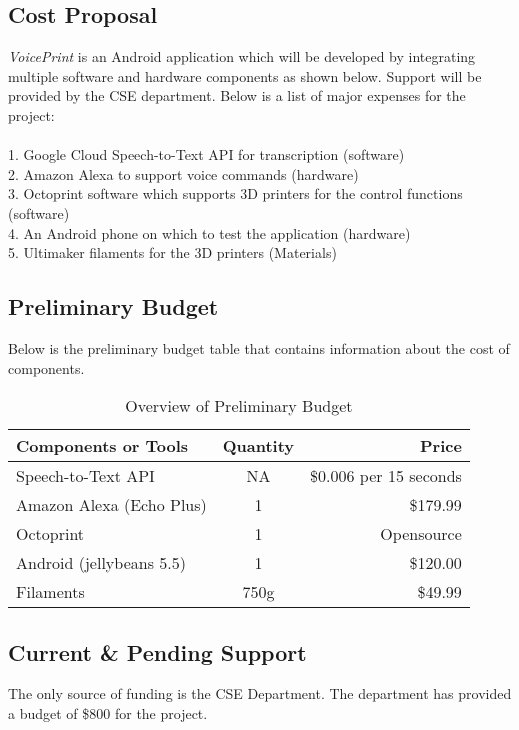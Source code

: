 \subsection{Cost Proposal}
\textit{VoicePrint} is an Android application which will be developed by integrating multiple software and hardware components as shown below. Support will be provided by the CSE department. Below is a list of major expenses for the project:
\\
\\
1. Google Cloud Speech-to-Text API for transcription (software)
\\
2. Amazon Alexa to support voice commands (hardware)
\\
3. Octoprint software which supports 3D printers for the control functions (software)
\\
4. An Android phone on which to test the application (hardware)
\\
5. Ultimaker filaments for the 3D printers (Materials) \\

\subsection{Preliminary Budget}
Below is the preliminary budget table that contains information about the cost of components. 
\begin{table}[H]
    \centering
    \begin{tabular}{|l|c|r|}
    	\hline
        \textbf{Components or Tools} & \textbf{Quantity} & \textbf{Price} \\
        \hline
	    Speech-to-Text API & NA & \$0.006 per 15 seconds\\
	    \hline
	    Amazon Alexa (Echo Plus) & 1 & \$179.99\\
	    \hline
    	Octoprint & 1 & Opensource\\
    	\hline
	    Android (jellybeans 5.5) & 1 & \$120.00\\
	    \hline
	    Filaments & 750g & \$49.99\\
	    \hline
    \end{tabular}
    \caption{Overview of Preliminary Budget}
\end{table}

\subsection{Current \& Pending Support}
The only source of funding is the CSE Department. The department has provided a budget of \$800 for the project. \\